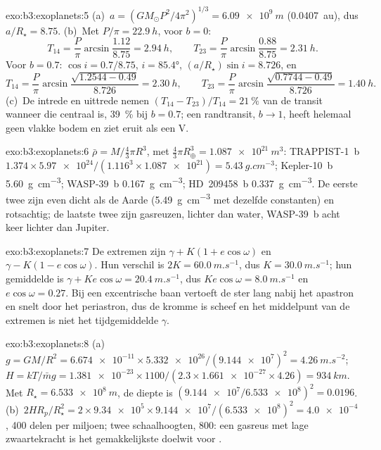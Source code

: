 \begin{solution}{exo:b3:exoplanets:5}
(a)~$a = (GM_\odot P^2/4\pi^2)^{1/3} = \qty{6.09e9}{m}$ (\qty{0.0407}{au}),
dus $a/R_\star = 8.75$. (b)~Met $P/\pi = \qty{22.9}{h}$, voor $b = 0$:
\[
T_{14} = \frac P\pi\arcsin\frac{1.12}{8.75} = \qty{2.94}{h}, \qquad
T_{23} = \frac P\pi\arcsin\frac{0.88}{8.75} = \qty{2.31}{h}.
\]
Voor $b = 0.7$: $\cos i = 0.7/8.75$, $i = \ang{85.4}$, $(a/R_\star)\sin i =
8.726$, en
\[
T_{14} = \frac P\pi\arcsin\frac{\sqrt{1.2544 - 0.49}}{8.726} = \qty{2.30}{h},
\qquad
T_{23} = \frac P\pi\arcsin\frac{\sqrt{0.7744 - 0.49}}{8.726} = \qty{1.40}{h}.
\]
(c)~De intrede en uittrede nemen $(T_{14} - T_{23})/T_{14} = \qty{21}{\percent}$
van de transit wanneer die centraal is, \qty{39}{\percent} bij $b = 0.7$; een
randtransit, $b \to 1$, heeft helemaal geen vlakke bodem en ziet eruit als een V.
\end{solution}

\begin{solution}{exo:b3:exoplanets:6}
$\bar\rho = M/\tfrac43\pi R^3$, met $\tfrac43\pi R_\oplus^3 =
\qty{1.087e21}{m^3}$: TRAPPIST-1~b $1.374\times\num{5.97e24}/(1.116^3\times
\num{1.087e21}) = \qty{5.43}{g.cm^{-3}}$; Kepler-10~b
\qty{5.60}{g.cm^{-3}}; WASP-39~b \qty{0.167}{g.cm^{-3}}; HD~209458~b
\qty{0.337}{g.cm^{-3}}. De eerste twee zijn even dicht als de Aarde
(\qty{5.49}{g.cm^{-3}} met dezelfde constanten) en rotsachtig; de laatste twee
zijn gasreuzen, lichter dan water, WASP-39~b acht keer lichter dan
Jupiter.
\end{solution}

\begin{solution}{exo:b3:exoplanets:7}
De extremen zijn $\gamma + K(1 + e\cos\omega)$ en $\gamma - K(1 -
e\cos\omega)$. Hun verschil is $2K = \qty{60.0}{m.s^{-1}}$, dus $K =
\qty{30.0}{m.s^{-1}}$; hun gemiddelde is $\gamma + Ke\cos\omega =
\qty{20.4}{m.s^{-1}}$, dus $Ke\cos\omega = \qty{8.0}{m.s^{-1}}$ en
$e\cos\omega = 0.27$. Bij een excentrische baan vertoeft de ster lang nabij
het apastron en snelt door het periastron, dus de kromme is scheef en het
middelpunt van de extremen is niet het tijdgemiddelde $\gamma$.
\end{solution}

\begin{solution}{exo:b3:exoplanets:8}
(a)~$g = GM/R^2 = \num{6.674e-11}\times\num{5.332e26}/(\num{9.144e7})^2 =
\qty{4.26}{m.s^{-2}}$; $H = kT/\bar m g = \num{1.381e-23}\times1100/(2.3
\times\num{1.661e-27}\times4.26) = \qty{934}{km}$. Met $R_\star =
\qty{6.533e8}{m}$, de diepte is $(\num{9.144e7}/\num{6.533e8})^2 =
\num{0.0196}$. (b)~$2HR_p/R_\star^2 = 2\times\num{9.34e5}\times
\num{9.144e7}/(\num{6.533e8})^2 = \num{4.0e-4}$, 400 delen per miljoen;
twee schaalhoogten, 800: een gasreus met lage zwaartekracht is het gemakkelijkste doelwit
voor .
\end{solution}

